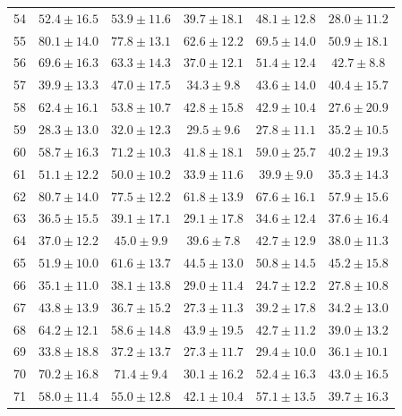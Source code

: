 \begin{tabular}{lccccc}
54 & $52.4 \pm 16.5$ & $\mathbf{53.9} \pm 11.6$ & $39.7 \pm 18.1$ & $48.1 \pm 12.8$ & $28.0 \pm 11.2$ \\
55 & $\mathbf{80.1} \pm 14.0$ & $77.8 \pm 13.1$ & $62.6 \pm 12.2$ & $69.5 \pm 14.0$ & $50.9 \pm 18.1$ \\
56 & $\mathbf{69.6} \pm 16.3$ & $63.3 \pm 14.3$ & $37.0 \pm 12.1$ & $51.4 \pm 12.4$ & $42.7 \pm 8.8$ \\
57 & $39.9 \pm 13.3$ & $\mathbf{47.0} \pm 17.5$ & $34.3 \pm 9.8$ & $43.6 \pm 14.0$ & $40.4 \pm 15.7$ \\
58 & $\mathbf{62.4} \pm 16.1$ & $53.8 \pm 10.7$ & $42.8 \pm 15.8$ & $42.9 \pm 10.4$ & $27.6 \pm 20.9$ \\
59 & $28.3 \pm 13.0$ & $32.0 \pm 12.3$ & $29.5 \pm 9.6$ & $27.8 \pm 11.1$ & $\mathbf{35.2} \pm 10.5$ \\
60 & $58.7 \pm 16.3$ & $\mathbf{71.2} \pm 10.3$ & $41.8 \pm 18.1$ & $59.0 \pm 25.7$ & $40.2 \pm 19.3$ \\
61 & $\mathbf{51.1} \pm 12.2$ & $50.0 \pm 10.2$ & $33.9 \pm 11.6$ & $39.9 \pm 9.0$ & $35.3 \pm 14.3$ \\
62 & $\mathbf{80.7} \pm 14.0$ & $77.5 \pm 12.2$ & $61.8 \pm 13.9$ & $67.6 \pm 16.1$ & $57.9 \pm 15.6$ \\
63 & $36.5 \pm 15.5$ & $\mathbf{39.1} \pm 17.1$ & $29.1 \pm 17.8$ & $34.6 \pm 12.4$ & $37.6 \pm 16.4$ \\
64 & $37.0 \pm 12.2$ & $\mathbf{45.0} \pm 9.9$ & $39.6 \pm 7.8$ & $42.7 \pm 12.9$ & $38.0 \pm 11.3$ \\
65 & $51.9 \pm 10.0$ & $\mathbf{61.6} \pm 13.7$ & $44.5 \pm 13.0$ & $50.8 \pm 14.5$ & $45.2 \pm 15.8$ \\
66 & $35.1 \pm 11.0$ & $\mathbf{38.1} \pm 13.8$ & $29.0 \pm 11.4$ & $24.7 \pm 12.2$ & $27.8 \pm 10.8$ \\
67 & $\mathbf{43.8} \pm 13.9$ & $36.7 \pm 15.2$ & $27.3 \pm 11.3$ & $39.2 \pm 17.8$ & $34.2 \pm 13.0$ \\
68 & $\mathbf{64.2} \pm 12.1$ & $58.6 \pm 14.8$ & $43.9 \pm 19.5$ & $42.7 \pm 11.2$ & $39.0 \pm 13.2$ \\
69 & $33.8 \pm 18.8$ & $\mathbf{37.2} \pm 13.7$ & $27.3 \pm 11.7$ & $29.4 \pm 10.0$ & $36.1 \pm 10.1$ \\
70 & $70.2 \pm 16.8$ & $\mathbf{71.4} \pm 9.4$ & $30.1 \pm 16.2$ & $52.4 \pm 16.3$ & $43.0 \pm 16.5$ \\
71 & $\mathbf{58.0} \pm 11.4$ & $55.0 \pm 12.8$ & $42.1 \pm 10.4$ & $57.1 \pm 13.5$ & $39.7 \pm 16.3$ \\

\end{tabular}
